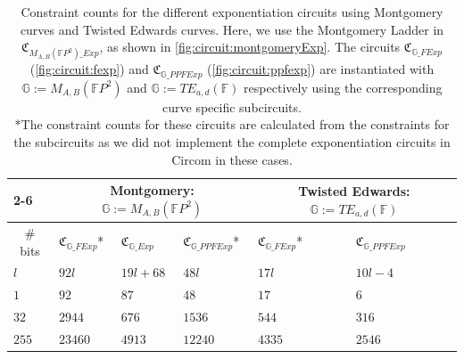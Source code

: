 
\begin{table}[h]
    \centering
    \renewcommand{\arraystretch}{1.3}
    \begin{tabular}{l|l|l|l||l|l|}
        \cline{2-6}
                                      & \multicolumn{3}{c||}{Montgomery: $\mathbb{G}:=M_{A,B}(\mathbb{F}P^2)$}                                                              & \multicolumn{2}{c|}{Twisted Edwards: $\mathbb{G}:=TE_{a,d}(\mathbb{F})$}                    \\ \hline
        \multicolumn{1}{|c|}{\# bits} & $\mathfrak{C}_{\mathbb{G}\_FExp}$*& $\mathfrak{C}_{\mathbb{G}\_Exp}$             & $\mathfrak{C}_{\mathbb{G}\_PPFExp}$*             & $\mathfrak{C}_{\mathbb{G}\_FExp}$*           & $\mathfrak{C}_{\mathbb{G}\_PPFExp}$           \\ \hline\hline
        \multicolumn{1}{|l|}{$l$    } & $92l$                             & $19l+68$                                             & $48l$                                              & $17l$                                     & \boldmath$10l-4$                                          \\ \hline
        \multicolumn{1}{|l|}{$1$    } & $92$                              & $87$                                             & $48$                                                 & $17$                                            & \boldmath$6$                                              \\ \hline
        \multicolumn{1}{|l|}{$32$   } & $2944$                                & $676$                                           & $1536$                                                 & $544$                                            & \boldmath$316$                                              \\ \hline
        \multicolumn{1}{|l|}{$255$  } & $23460$                                & $4913$                                           & $12240$                                                 & $4335$                                            & \boldmath$2546$                                              \\ \hline
    \end{tabular}
    \renewcommand{\arraystretch}{1.0}
    \caption{Constraint counts for the different exponentiation circuits using Montgomery curves and Twisted Edwards curves.
    Here, we use the Montgomery Ladder in $\mathfrak{C}_{M_{A,B}(\mathbb{F}P^2)\_Exp}$, as shown in \cref{fig:circuit:montgomeryExp}.
    The circuits $\mathfrak{C}_{\mathbb{G}\_FExp}$ (\cref{fig:circuit:fexp}) and $\mathfrak{C}_{\mathbb{G}\_PPFExp}$ (\cref{fig:circuit:ppfexp}) are instantiated with $\mathbb{G}:=M_{A,B}(\mathbb{F}P^2)$ and $\mathbb{G}:=TE_{a,d}(\mathbb{F})$ respectively using the corresponding curve specific subcircuits.\\
    *The constraint counts for these circuits are calculated from the constraints for the subcircuits as we did not implement the complete exponentiation circuits in Circom in these cases.
    }
    \label{tab:expConstraintComp}
\end{table}